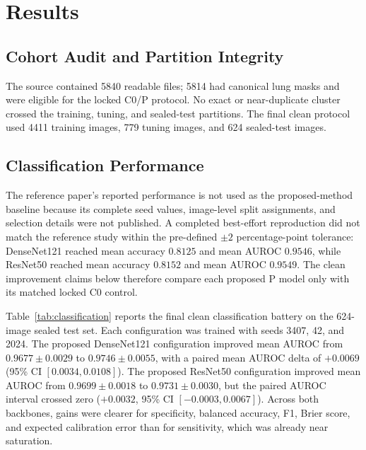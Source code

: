 \documentclass[runningheads]{llncs}
\begin{document}
\section{Results}

\subsection{Cohort Audit and Partition Integrity}

The source contained 5840 readable files; 5814 had canonical lung masks and were
eligible for the locked C0/P protocol. No exact or near-duplicate cluster crossed
the training, tuning, and sealed-test partitions. The final clean protocol used
4411 training images, 779 tuning images, and 624 sealed-test images.

\subsection{Classification Performance}

The reference paper's reported performance is not used as the proposed-method
baseline because its complete seed values, image-level split assignments, and
selection details were not published. A completed best-effort reproduction did not
match the reference study within the pre-defined $\pm2$ percentage-point tolerance:
DenseNet121 reached mean accuracy $0.8125$ and mean AUROC $0.9546$, while ResNet50
reached mean accuracy $0.8152$ and mean AUROC $0.9549$. The clean improvement
claims below therefore compare each proposed P model only with its matched locked
C0 control.

Table~\ref{tab:classification} reports the final clean classification battery on
the 624-image sealed test set. Each configuration was trained with seeds 3407, 42,
and 2024. The proposed DenseNet121 configuration improved mean AUROC from
$0.9677 \pm 0.0029$ to $0.9746 \pm 0.0055$, with a paired mean AUROC delta of
$+0.0069$ (95\% CI $[0.0034,0.0108]$). The proposed ResNet50 configuration
improved mean AUROC from $0.9699 \pm 0.0018$ to $0.9731 \pm 0.0030$, but the
paired AUROC interval crossed zero ($+0.0032$, 95\% CI $[-0.0003,0.0067]$).
Across both backbones, gains were clearer for specificity, balanced accuracy,
F1, Brier score, and expected calibration error than for sensitivity, which was
already near saturation.
\end{document}
